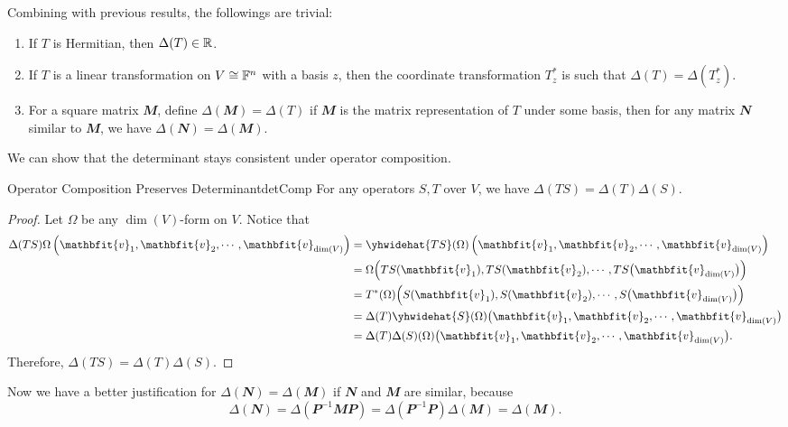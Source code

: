 \documentclass[math]{amznotes}
\theoremstyle{remark}
\begin{document}
Combining with previous results, the followings are trivial:
\begin{enumerate}
    \item If $T$ is Hermitian, then $\Delta(T) \in \mathbb{R}$.
    \item If $T$ is a linear transformation on $V \cong \mathbb{F}^n$ with a basis $z$, then the coordinate transformation $T^*_z$ is such that $\Delta(T) = \Delta\left(T^*_z\right)$.
    \item For a square matrix $\mathbfit{M}$, define $\Delta(\mathbfit{M}) = \Delta(T)$ if $\mathbfit{M}$ is the matrix representation of $T$ under some basis, then for any matrix $\mathbfit{N}$ similar to $\mathbfit{M}$, we have $\Delta(\mathbfit{N}) = \Delta(\mathbfit{M})$.
\end{enumerate}
We can show that the determinant stays consistent under operator composition.
\begin{probox}{Operator Composition Preserves Determinant}{detComp}
    For any operators $S, T$ over $V$, we have $\Delta(TS) = \Delta(T)\Delta(S)$.
    \tcblower
    \begin{proof}
        Let $\Omega$ be any $\dim(V)$-form on $V$. Notice that 
        \begin{align*}
            \Delta(TS)\Omega\left(\mathbfit{v}_1, \mathbfit{v}_2, \cdots, \mathbfit{v}_{\dim(V)}\right) & = \yhwidehat{TS}(\Omega)\left(\mathbfit{v}_1, \mathbfit{v}_2, \cdots, \mathbfit{v}_{\dim(V)}\right) \\
            & = \Omega\Bigl(TS(\mathbfit{v}_1), TS(\mathbfit{v}_2), \cdots, TS\bigl(\mathbfit{v}_{\dim(V)}\bigr)\Bigr) \\
            & = T^*(\Omega)\Bigl(S(\mathbfit{v}_1), S(\mathbfit{v}_2), \cdots, S\bigl(\mathbfit{v}_{\dim(V)}\bigr)\Bigr) \\
            & = \Delta(T)\yhwidehat{S}(\Omega)\bigl(\mathbfit{v}_1, \mathbfit{v}_2, \cdots, \mathbfit{v}_{\dim(V)}\bigr) \\
            & = \Delta(T)\Delta(S)(\Omega)\bigl(\mathbfit{v}_1, \mathbfit{v}_2, \cdots, \mathbfit{v}_{\dim(V)}\bigr).
        \end{align*}
        Therefore, $\Delta(TS) = \Delta(T)\Delta(S)$.
    \end{proof}
\end{probox}
Now we have a better justification for $\Delta(\mathbfit{N}) = \Delta(\mathbfit{M})$ if $\mathbfit{N}$ and $\mathbfit{M}$ are similar, because 
\begin{equation*}
    \Delta(\mathbfit{N}) = \Delta\left(\mathbfit{P}^{-1}\mathbfit{M}\mathbfit{P}\right) = \Delta\left(\mathbfit{P}^{-1}\mathbfit{P}\right)\Delta(\mathbfit{M}) = \Delta(\mathbfit{M}).
\end{equation*}
\end{document}
